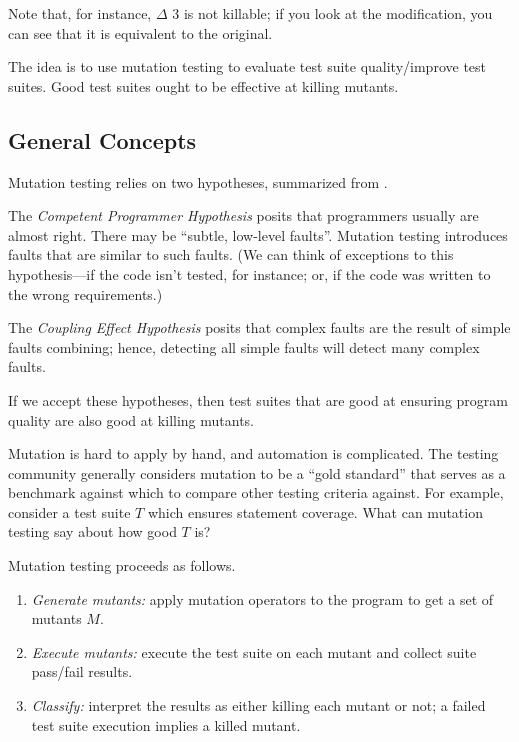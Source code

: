 \documentclass[11pt]{article}
\begin{document}
Note that, for instance, $\Delta$ 3 is not killable; if you look at the modification,
you can see that it is equivalent to the original.

The idea is to use mutation testing to evaluate test suite quality/improve test suites.
Good test suites ought to be effective at killing mutants.

\subsection*{General Concepts}

Mutation testing relies on two hypotheses, summarized from \cite{delgado-perez18:_evaluat_mutat_testin_nuclear_indus_case_study}.

The \emph{Competent Programmer Hypothesis} posits that programmers usually are almost right.
There may be ``subtle, low-level faults''. Mutation testing introduces faults that
are similar to such faults. (We can think of exceptions to this hypothesis---if
the code isn't tested, for instance; or, if the code was written to the wrong
requirements.)

The \emph{Coupling Effect Hypothesis} posits that complex faults are the result of
simple faults combining; hence, detecting all simple faults will detect many
complex faults.

If we accept these hypotheses, then test suites that are good at ensuring program
quality are also good at killing mutants.

Mutation is hard to apply by hand, and automation is
complicated.  The testing community generally considers mutation to be
a ``gold standard'' that serves as a benchmark against which to
compare other testing criteria against. For example, consider a test suite
$T$ which ensures statement coverage. What can mutation testing say about
how good $T$ is?

Mutation testing proceeds as follows.

\begin{enumerate}[noitemsep]
\item \emph{Generate mutants:} apply mutation operators to the program to get a set of mutants $M$. 
\item \emph{Execute mutants:} execute the test suite on each mutant and collect suite pass/fail results.
\item \emph{Classify:} interpret the results as either killing each mutant or not; a failed test suite execution implies a killed mutant.
\end{enumerate}
\end{document}
